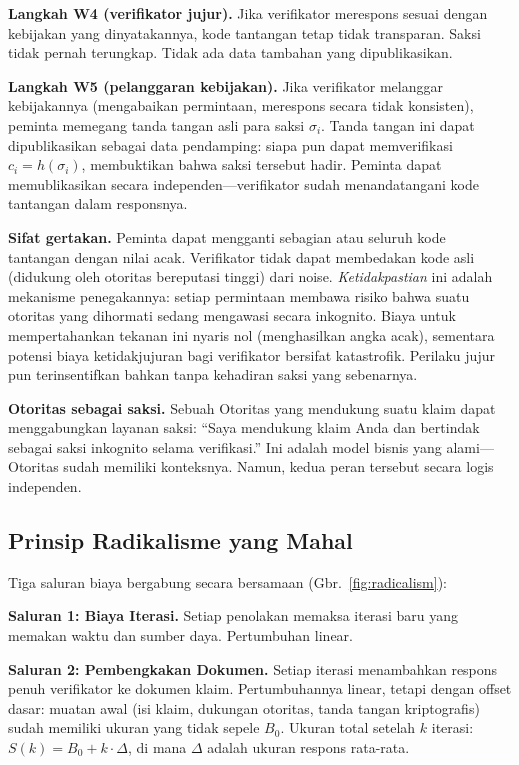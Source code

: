 \documentclass[11pt,a4paper,twocolumn]{article}
\begin{document}
\textbf{Langkah W4 (verifikator jujur).} Jika verifikator merespons sesuai dengan kebijakan yang dinyatakannya, kode tantangan tetap tidak transparan. Saksi tidak pernah terungkap. Tidak ada data tambahan yang dipublikasikan.

\textbf{Langkah W5 (pelanggaran kebijakan).} Jika verifikator melanggar kebijakannya (mengabaikan permintaan, merespons secara tidak konsisten), peminta memegang tanda tangan asli para saksi $\sigma_i$. Tanda tangan ini dapat dipublikasikan sebagai data pendamping: siapa pun dapat memverifikasi $c_i = h(\sigma_i)$, membuktikan bahwa saksi tersebut hadir. Peminta dapat memublikasikan secara independen---verifikator sudah menandatangani kode tantangan dalam responsnya.

\textbf{Sifat gertakan.} Peminta dapat mengganti sebagian atau seluruh kode tantangan dengan nilai acak. Verifikator tidak dapat membedakan kode asli (didukung oleh otoritas bereputasi tinggi) dari noise. \emph{Ketidakpastian} ini adalah mekanisme penegakannya: setiap permintaan membawa risiko bahwa suatu otoritas yang dihormati sedang mengawasi secara inkognito. Biaya untuk mempertahankan tekanan ini nyaris nol (menghasilkan angka acak), sementara potensi biaya ketidakjujuran bagi verifikator bersifat katastrofik. Perilaku jujur pun terinsentifkan bahkan tanpa kehadiran saksi yang sebenarnya.

\textbf{Otoritas sebagai saksi.} Sebuah Otoritas yang mendukung suatu klaim dapat menggabungkan layanan saksi: ``Saya mendukung klaim Anda dan bertindak sebagai saksi inkognito selama verifikasi.'' Ini adalah model bisnis yang alami---Otoritas sudah memiliki konteksnya. Namun, kedua peran tersebut secara logis independen.

\subsection{Prinsip Radikalisme yang Mahal}

Tiga saluran biaya bergabung secara bersamaan (Gbr.~\ref{fig:radicalism}):

\textbf{Saluran 1: Biaya Iterasi.} Setiap penolakan memaksa iterasi baru yang memakan waktu dan sumber daya. Pertumbuhan linear.

\textbf{Saluran 2: Pembengkakan Dokumen.} Setiap iterasi menambahkan respons penuh verifikator ke dokumen klaim. Pertumbuhannya linear, tetapi dengan offset dasar: muatan awal (isi klaim, dukungan otoritas, tanda tangan kriptografis) sudah memiliki ukuran yang tidak sepele $B_0$. Ukuran total setelah $k$ iterasi: $S(k) = B_0 + k \cdot \Delta$, di mana $\Delta$ adalah ukuran respons rata-rata.
\end{document}

